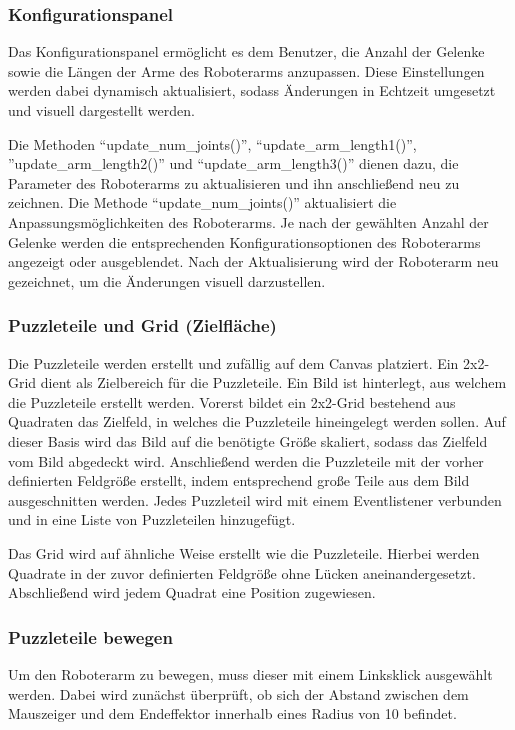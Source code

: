 \documentclass[12pt]{article}
\begin{document}
    \subsubsection{Konfigurationspanel}
    Das Konfigurationspanel ermöglicht es dem Benutzer, die Anzahl der Gelenke sowie die Längen der Arme
    des Roboterarms anzupassen. Diese Einstellungen werden dabei dynamisch aktualisiert, sodass Änderungen
    in Echtzeit umgesetzt und visuell dargestellt werden.

    Die Methoden “update\_num\_joints()”, “update\_arm\_length1()”,
    ”update\_arm\_length2()” und
    “update\_arm\_length3()” dienen dazu, die Parameter des Roboterarms zu aktualisieren und ihn
    anschließend neu zu zeichnen.
    Die Methode “update\_num\_joints()” aktualisiert die Anpassungsmöglichkeiten des Roboterarms. Je nach
    der gewählten Anzahl der Gelenke werden die entsprechenden Konfigurationsoptionen des Roboterarms
    angezeigt oder ausgeblendet. Nach der Aktualisierung wird der Roboterarm neu gezeichnet, um die
    Änderungen visuell darzustellen.

    \subsubsection{Puzzleteile und Grid (Zielfläche)}
    Die Puzzleteile werden erstellt und zufällig auf dem Canvas platziert. Ein 2x2-Grid dient als
    Zielbereich für die Puzzleteile. Ein Bild ist hinterlegt, aus welchem die Puzzleteile erstellt werden.
    Vorerst bildet ein 2x2-Grid bestehend aus Quadraten das Zielfeld, in welches die Puzzleteile
    hineingelegt werden sollen. Auf dieser Basis wird das Bild auf die benötigte Größe skaliert, sodass
    das Zielfeld vom Bild abgedeckt wird. Anschließend werden die Puzzleteile mit der vorher definierten
    Feldgröße erstellt, indem entsprechend große Teile aus dem Bild ausgeschnitten werden. Jedes
    Puzzleteil wird mit einem Eventlistener verbunden und in eine Liste von Puzzleteilen hinzugefügt.


    Das Grid wird auf ähnliche Weise erstellt wie die Puzzleteile. Hierbei werden Quadrate in der zuvor
    definierten Feldgröße ohne Lücken aneinandergesetzt. Abschließend wird jedem Quadrat eine Position
    zugewiesen.

    \subsubsection{Puzzleteile bewegen}
    Um den Roboterarm zu bewegen, muss dieser mit einem Linksklick ausgewählt werden. Dabei wird zunächst
    überprüft, ob sich der Abstand zwischen dem Mauszeiger und dem Endeffektor innerhalb eines Radius
    von 10 befindet.
\end{document}
